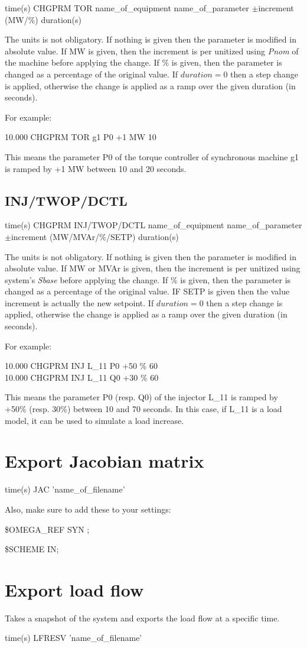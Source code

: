 time(s) CHGPRM TOR name\_of\_equipment name\_of\_parameter
	$\pm$increment (MW/\%) duration(s) 
	
The units is
not obligatory. If nothing is given then the parameter is modified
in absolute value. If MW is given, then the increment is per unitized
using \emph{Pnom} of the machine before applying the change. If \%
is given, then the parameter is changed as a percentage of the original
value. If $duration=0$ then a step change is applied, otherwise the
change is applied as a ramp over the given duration (in seconds). 

For example:

10.000 CHGPRM TOR g1 P0 +1 MW 10 

This
means the parameter P0 of the torque controller of synchronous machine
g1 is ramped by +1 MW between 10 and 20 seconds.


\subsection{INJ/TWOP/DCTL}

time(s) CHGPRM INJ/TWOP/DCTL name\_of\_equipment
	name\_of\_parameter $\pm$increment (MW/MVAr/\%/SETP) duration(s)

The units is not obligatory. If nothing is given
then the parameter is modified in absolute value. If MW or MVAr is
given, then the increment is per unitized using system's \emph{Sbase}
before applying the change. If \% is given, then the parameter is
changed as a percentage of the original value. IF SETP is given then
the value increment is actually the new setpoint. If $duration=0$
then a step change is applied, otherwise the change is applied as
a ramp over the given duration (in seconds). 

For example:

10.000 CHGPRM INJ L\_11 P0 +50 \% 60 \\
10.000 CHGPRM INJ L\_11 Q0 +30 \% 60 
	
	This means the
parameter P0 (resp. Q0) of the injector L\_11 is ramped by +50\% (resp.
30\%) between 10 and 70 seconds. In this case, if L\_11 is a load
model, it can be used to simulate a load increase.


\section{Export Jacobian matrix}

time(s) JAC 'name\_of\_filename' 

Also, make sure to add these to your settings:

\$OMEGA\_REF SYN ;
	
\$SCHEME IN;


\section{Export load flow}

Takes a snapshot of the system and exports the load flow at a specific time.

time(s) LFRESV 'name\_of\_filename' 